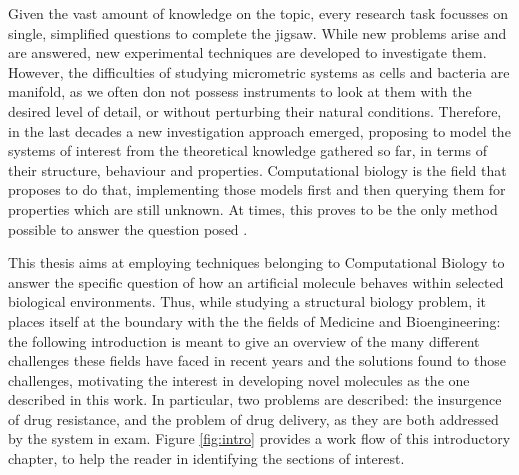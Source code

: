 Given the vast amount of knowledge on the topic, every research task focusses on single, simplified questions to complete the jigsaw. While new problems arise and are answered, new experimental techniques are developed to investigate them. However, the difficulties of studying micrometric systems as cells and bacteria are manifold, as we often don not possess instruments to look at them with the desired level of detail, or without perturbing their natural conditions. Therefore, in the last decades a new investigation approach emerged, proposing to model the systems of interest from the theoretical knowledge gathered so far, in terms of their structure, behaviour and properties.
%
Computational biology is the field that proposes to do that, implementing those models first and then querying them for properties which are still unknown. At times, this proves to be the only method possible to answer the question posed \citep{Lee2009,Dror2012,Chou2015,Leipzig2016}.

This thesis aims at employing techniques belonging to Computational Biology to answer the specific question of how an artificial molecule behaves within selected biological environments.
%
Thus, while studying a structural biology problem, it places itself at the boundary with the the fields of Medicine and Bioengineering: the following introduction is meant to give an overview of the many different challenges these fields have faced in recent years and the solutions found to those challenges, motivating the interest in developing novel molecules as the one described in this work. In particular, two problems are described: the insurgence of drug resistance, and the problem of drug delivery, as they are both addressed by the system in exam. Figure \ref{fig:intro} provides a work flow of this introductory chapter, to help the reader in identifying the sections of interest.

